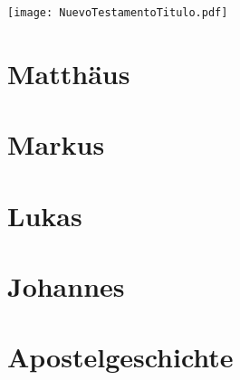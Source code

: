 \newpage

\pagestyle{empty}

\null\vfill
\begin{center}
\begin{minipage}[c]{\textwidth}
  \begin{center}
  \texttt{[image: NuevoTestamentoTitulo.pdf]}
  \end{center}
\end{minipage}
\end{center}
\null\vfill
\newpage

\pagestyle{bible}

\chapter{Matthäus}
\begin{multicols}{2}
  \raggedcolumns
  \parskip=0pt \relax
  
\end{multicols}

\chapter{Markus}
\begin{multicols}{2}
  \raggedcolumns
  \parskip=0pt \relax
  
\end{multicols}

\chapter{Lukas}
\begin{multicols}{2}
  \raggedcolumns
  \parskip=0pt \relax
  
\end{multicols}

\chapter{Johannes}
\begin{multicols}{2}
  \raggedcolumns
  \parskip=0pt \relax
  
\end{multicols}

\chapter{Apostelgeschichte}
\begin{multicols}{2}
  \raggedcolumns
  \parskip=0pt \relax
  
\end{multicols}

